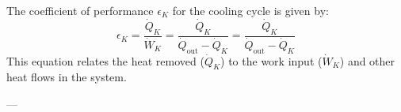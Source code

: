 The coefficient of performance \( \epsilon_K \) for the cooling cycle is given by:  
\[
\epsilon_K = \frac{\dot{Q}_K}{\dot{W}_K} = \frac{\dot{Q}_K}{\dot{Q}_{\text{out}} - \dot{Q}_K} = \frac{\dot{Q}_K}{\dot{Q}_{\text{out}} - \dot{Q}_K}
\]  
This equation relates the heat removed (\( \dot{Q}_K \)) to the work input (\( \dot{W}_K \)) and other heat flows in the system.

---
